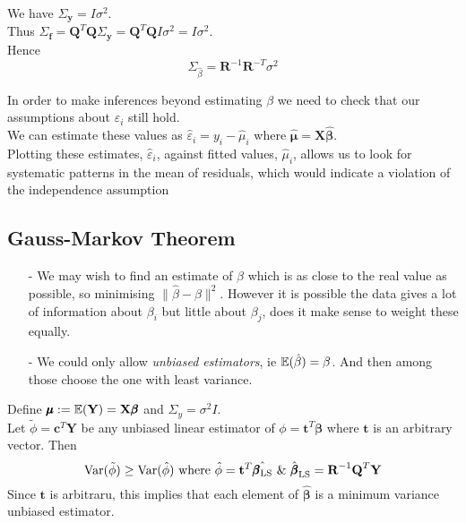 \documentclass[11pt,a4paper]{article}
\begin{document}
We have $\Sigma_\textbf{y}=I\sigma^2$.\\
Thus $\Sigma_\textbf{f}=\textbf{Q}^T\textbf{Q}\Sigma_\textbf{y}=\textbf{Q}^T\textbf{Q}I\sigma^2=I\sigma^2$.\\
Hence
$$\Sigma_{\hat\beta}=\textbf{R}^{-1}\textbf{R}^{-T}\sigma^2$$

In order to make inferences beyond estimating $\beta$ we need to check that our assumptions about $\varepsilon_i$ still hold.\\
We can estimate these values as $\hat\varepsilon_i=y_i-\hat\mu_i$ where $\hat{\pmb\mu}=\textbf{X}\hat{\pmb\beta}$.\\
Plotting these estimates, $\hat\varepsilon_i$, against fitted values, $\hat\mu_i$, allows us to look for systematic patterns in the mean of residuals, which would indicate a violation of the independence assumption

\subsection{Gauss-Markov Theorem}

\begin{itemize}
	\item[-] We may wish to find an estimate of $\beta$ which is as close to the real value as possible, so minimising $\|\hat\beta-\beta\|^2$. However it is possible the data gives a lot of information about $\beta_i$ but little about $\beta_j$, does it make sense to weight these equally.
	\item[-] We could only allow \textit{unbiased estimators}, ie $\mathbb{E}(\hat\beta)=\beta$. And then among those choose the one with least variance.
\end{itemize}

Define $\pmb\mu:=\mathbb{E}(\textbf{Y})=\textbf{X}\pmb\beta$ and $\Sigma_y=\sigma^2I$.\\
Let $\tilde\phi=\textbf{c}^T\textbf{Y}$ be any unbiased linear estimator of $\phi=\textbf{t}^T\pmb\beta$ where $\textbf{t}$ is an arbitrary vector. Then
$$\var(\tilde\phi)\geq\var(\hat\phi)\text{ where }\hat\phi=\textbf{t}^T\hat{\pmb\beta_\text{LS}}\ \&\ \hat{\pmb\beta}_\text{LS}=\textbf{R}^{-1}\textbf{Q}^T\textbf{Y}$$
Since $\textbf{t}$ is arbitraru, this implies that each element of $\hat{\pmb\beta}$ is a minimum variance unbiased estimator.\\
\end{document}
